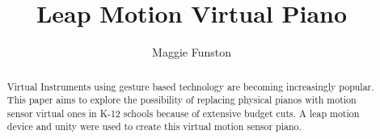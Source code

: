 \documentclass[sigconf,authordraft]{acmart}
\begin{document}
\title{Leap Motion Virtual Piano}


\author{Maggie Funston}




\renewcommand{\shortauthors}{Trovato and Tobin, et al.}

\begin{abstract}
 Virtual Instruments using gesture based technology are becoming increasingly popular.  This paper aims to explore the possibility of replacing physical pianos with motion sensor virtual ones in K-12 schools because of extensive budget cuts.
 A leap motion device and unity were used to create this virtual motion sensor piano.
\end{abstract}

\end{document}

